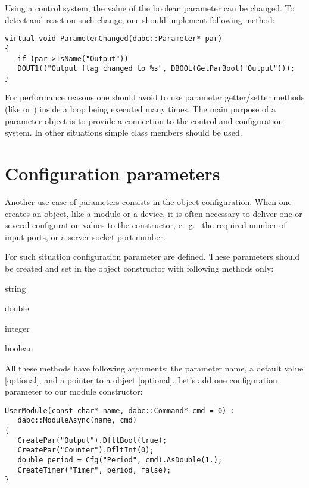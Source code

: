 Using a control system, the value of the boolean parameter can be changed. 
To detect and react on such change,
one should implement following method: 
 
\begin{verbatim}
virtual void ParameterChanged(dabc::Parameter* par) 
{
   if (par->IsName("Output")) 
   DOUT1(("Output flag changed to %s", DBOOL(GetParBool("Output")));
}
\end{verbatim}

For performance reasons one should avoid to use parameter getter/setter methods 
(like   or ) inside a loop 
being executed many times. The main purpose of a parameter
object is to provide a connection to the control and configuration system.
In other situations simple class members should be used.


\section{Configuration parameters}
\label{prog_setup_configurationparameter}
Another use case of parameters consists in the object configuration.
When one creates an object, like a module or a device, 
it is often necessary to deliver one or several configuration values 
to the constructor, e.~g.~ the required
number of input ports, or a server socket port number. 

For such situation configuration parameter are defined.
These parameters should be created and set 
in the object constructor with following methods only:


\bdes
\item[GetCfgStr]  string
\item[GetCfgDouble]   double 
\item[GetCfgInt]   integer
\item[GetCfgBool]   boolean 
\edes

All these methods have following arguments: the parameter name, 
a default value [optional], and a pointer to a  object [optional].
Let's add one configuration parameter to our module constructor:

\begin{small}
\begin{verbatim}
UserModule(const char* name, dabc::Command* cmd = 0) : 
   dabc::ModuleAsync(name, cmd)
{
   CreatePar("Output").DfltBool(true);
   CreatePar("Counter").DfltInt(0);
   double period = Cfg("Period", cmd).AsDouble(1.);
   CreateTimer("Timer", period, false);
}
\end{verbatim}
\end{small}

